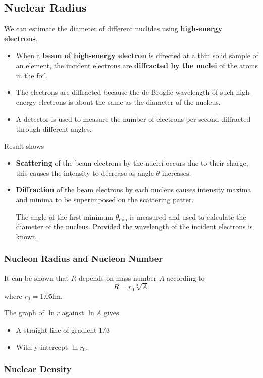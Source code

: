 \subsection{Nuclear Radius}

We can estimate the diameter of different nuclides using \textbf{high-energy electrons}.
\begin{itemize}
    \item When a \textbf{beam of high-energy electron} is directed at a thin solid sample of an element, the incident electrons are \textbf{diffracted by the nuclei} of the atoms in the foil.
    \item The electrons are diffracted because the de Broglie wavelength of such high-energy electrons is about the same as the diameter of the nucleus.
    \item A detector is used to measure the number of electrons per second diffracted through different angles.
\end{itemize}

Result shows
\begin{itemize}
    \item \textbf{Scattering} of the beam electrons by the nuclei occurs due to their charge, this causes the intensity to decrease as angle $\theta$ increases.
    \item \textbf{Diffraction} of the beam electrons by each nucleus causes intensity maxima and minima to be superimposed on the scattering patter.

        The angle of the first minimum $\theta_\text{min}$ is measured and used to calculate the diameter of the nucleus. Provided the wavelength of the incident electrons is known.
\end{itemize}

\subsubsection*{Nucleon Radius and Nucleon Number}

It can be shown that $R$ depends on mass number $A$ according to
$$R=r_0\sqrt[3]{A}$$
where $r_0=1.05$fm.

The graph of $\ln r$ against $\ln A$ gives
\begin{itemize}
    \item A straight line of gradient $1/3$
    \item With y-intercept $\ln r_0$.
\end{itemize}

\subsubsection*{Nuclear Density}

